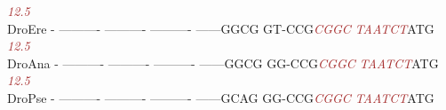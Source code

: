 \documentclass[11pt,twoside,reqno,a4paper]{article}
\begin{document}
{\hspace*{7\charwidth}\hspace*{1\charwidth}\hspace*{1\charwidth}\hspace*{1\charwidth}\hspace*{1\charwidth}\hspace*{1\charwidth}\hspace*{47\charwidth}\textit{\textcolor{Brown}{12.5}}\hspace*{1\charwidth}\\
DroEre	-	----------	----------	----------	------GGCG	GT-CCG\textit{\textcolor{Brown}{C}}\textit{\textcolor{Brown}{G}}\textit{\textcolor{Brown}{G}}\textit{\textcolor{Brown}{C}}	\textit{\textcolor{Brown}{T}}\textit{\textcolor{Brown}{A}}\textit{\textcolor{Brown}{A}}\textit{\textcolor{Brown}{T}}\textit{\textcolor{Brown}{C}}\textit{\textcolor{Brown}{T}}ATG\\
\hspace*{7\charwidth}\hspace*{1\charwidth}\hspace*{1\charwidth}\hspace*{1\charwidth}\hspace*{1\charwidth}\hspace*{1\charwidth}\hspace*{47\charwidth}\textit{\textcolor{Brown}{12.5}}\hspace*{1\charwidth}\\
DroAna	-	----------	----------	----------	------GGCG	GG-CCG\textit{\textcolor{Brown}{C}}\textit{\textcolor{Brown}{G}}\textit{\textcolor{Brown}{G}}\textit{\textcolor{Brown}{C}}	\textit{\textcolor{Brown}{T}}\textit{\textcolor{Brown}{A}}\textit{\textcolor{Brown}{A}}\textit{\textcolor{Brown}{T}}\textit{\textcolor{Brown}{C}}\textit{\textcolor{Brown}{T}}ATG\\
\hspace*{7\charwidth}\hspace*{1\charwidth}\hspace*{1\charwidth}\hspace*{1\charwidth}\hspace*{1\charwidth}\hspace*{1\charwidth}\hspace*{47\charwidth}\textit{\textcolor{Brown}{12.5}}\hspace*{1\charwidth}\\
DroPse	-	----------	----------	----------	------GCAG	GG-CCG\textit{\textcolor{Brown}{C}}\textit{\textcolor{Brown}{G}}\textit{\textcolor{Brown}{G}}\textit{\textcolor{Brown}{C}}	\textit{\textcolor{Brown}{T}}\textit{\textcolor{Brown}{A}}\textit{\textcolor{Brown}{A}}\textit{\textcolor{Brown}{T}}\textit{\textcolor{Brown}{C}}\textit{\textcolor{Brown}{T}}ATG\\
}
\end{document}
